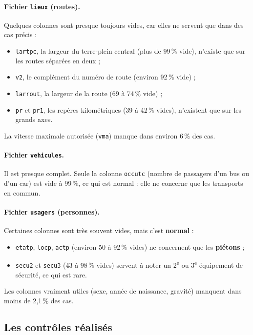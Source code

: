 \documentclass[11pt,a4paper]{article}
\begin{document}
\paragraph{Fichier \texttt{lieux} (routes).} Quelques colonnes sont presque
toujours vides, car elles ne servent que dans des cas précis :
\begin{itemize}
  \item \texttt{lartpc}, la largeur du terre-plein central (plus de 99\,\%
        vide), n'existe que sur les routes séparées en deux ;
  \item \texttt{v2}, le complément du numéro de route (environ 92\,\% vide) ;
  \item \texttt{larrout}, la largeur de la route (69 à 74\,\% vide) ;
  \item \texttt{pr} et \texttt{pr1}, les repères kilométriques (39 à 42\,\%
        vides), n'existent que sur les grands axes.
\end{itemize}
La vitesse maximale autorisée (\texttt{vma}) manque dans environ 6\,\% des cas.

\paragraph{Fichier \texttt{vehicules}.} Il est presque complet. Seule la
colonne \texttt{occutc} (nombre de passagers d'un bus ou d'un car) est vide à
99\,\%, ce qui est normal : elle ne concerne que les transports en commun.

\paragraph{Fichier \texttt{usagers} (personnes).} Certaines colonnes sont très
souvent vides, mais c'est \textbf{normal} :
\begin{itemize}
  \item \texttt{etatp}, \texttt{locp}, \texttt{actp} (environ 50 à 92\,\% vides)
        ne concernent que les \textbf{piétons} ;
  \item \texttt{secu2} et \texttt{secu3} (43 à 98\,\% vides) servent à noter un
        2\textsuperscript{e} ou 3\textsuperscript{e} équipement de sécurité,
        ce qui est rare.
\end{itemize}
Les colonnes vraiment utiles (sexe, année de naissance, gravité) manquent dans
moins de 2,1\,\% des cas.

\subsection{Les contrôles réalisés}
\end{document}
